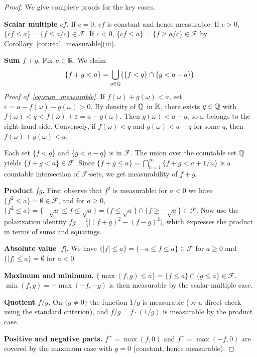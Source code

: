 \documentclass[11pt,a4paper]{article}
\begin{document}
\begin{proof}
We give complete proofs for the key cases.

\textbf{Scalar multiple $cf$.} If $c = 0$, $cf$ is constant and hence
measurable. If $c > 0$, $\{cf \leq a\} = \{f \leq a/c\} \in \mathcal{F}$.
If $c < 0$, $\{cf \leq a\} = \{f \geq a/c\} \in \mathcal{F}$ by
Corollary~\ref{cor:real_measurable}(iii).

\textbf{Sum $f + g$.} Fix $a \in \mathbb{R}$. We claim
\begin{equation}
  \{f + g < a\}
  = \bigcup_{q \in \mathbb{Q}} \bigl(\{f < q\} \cap \{g < a - q\}\bigr).
  \label{eq:sum_measurable}
\end{equation}
\textit{Proof of~\eqref{eq:sum_measurable}.}
If $f(\omega) + g(\omega) < a$, set $\varepsilon = a - f(\omega) - g(\omega) > 0$.
By density of $\mathbb{Q}$ in $\mathbb{R}$, there exists $q \in \mathbb{Q}$ with
$f(\omega) < q < f(\omega) + \varepsilon = a - g(\omega)$.
Then $g(\omega) < a - q$, so $\omega$ belongs to the right-hand side.
Conversely, if $f(\omega) < q$ and $g(\omega) < a - q$ for some $q$, then
$f(\omega) + g(\omega) < a$.

Each set $\{f < q\}$ and $\{g < a - q\}$ is in $\mathcal{F}$. The union
over the countable set $\mathbb{Q}$ yields $\{f + g < a\} \in \mathcal{F}$.
Since $\{f + g \leq a\} = \bigcap_{n=1}^\infty \{f + g < a + 1/n\}$ is a
countable intersection of $\mathcal{F}$-sets, we get measurability of $f+g$.

\textbf{Product $fg$.} First observe that $f^2$ is measurable: for $a < 0$
we have $\{f^2 \leq a\} = \emptyset \in \mathcal{F}$, and for $a \geq 0$,
$\{f^2 \leq a\} = \{-\sqrt{a} \leq f \leq \sqrt{a}\}
= \{f \leq \sqrt{a}\} \cap \{f \geq -\sqrt{a}\} \in \mathcal{F}$.
Now use the polarization identity
$fg = \tfrac{1}{4}\bigl[(f+g)^2 - (f-g)^2\bigr]$, which expresses the
product in terms of sums and squarings.

\textbf{Absolute value $|f|$.} We have
$\{|f| \leq a\} = \{-a \leq f \leq a\} \in \mathcal{F}$ for $a \geq 0$
and $\{|f| \leq a\} = \emptyset$ for $a < 0$.

\textbf{Maximum and minimum.} $\{\max(f,g) \leq a\} = \{f \leq a\}
\cap \{g \leq a\} \in \mathcal{F}$.
$\min(f,g) = -\max(-f, -g)$ is then measurable by the scalar-multiple case.

\textbf{Quotient $f/g$.} On $\{g \neq 0\}$ the function $1/g$ is measurable
(by a direct check using the standard criterion), and $f/g = f \cdot (1/g)$
is measurable by the product case.

\textbf{Positive and negative parts.} $f^+ = \max(f, 0)$ and
$f^- = \max(-f, 0)$ are covered by the maximum case with $g = 0$ (constant,
hence measurable).
\end{proof}
\end{document}
